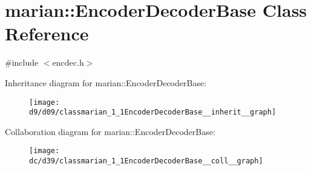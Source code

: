 \hypertarget{classmarian_1_1EncoderDecoderBase}{}\section{marian\+:\+:Encoder\+Decoder\+Base Class Reference}
\label{classmarian_1_1EncoderDecoderBase}


{\ttfamily \#include $<$encdec.\+h$>$}



Inheritance diagram for marian\+:\+:Encoder\+Decoder\+Base\+:
\nopagebreak
\begin{figure}[H]
\begin{center}
\leavevmode
\texttt{[image: d9/d09/classmarian\_1\_1EncoderDecoderBase\_\_inherit\_\_graph]}
\end{center}
\end{figure}


Collaboration diagram for marian\+:\+:Encoder\+Decoder\+Base\+:
\nopagebreak
\begin{figure}[H]
\begin{center}
\leavevmode
\texttt{[image: dc/d39/classmarian\_1\_1EncoderDecoderBase\_\_coll\_\_graph]}
\end{center}
\end{figure}
